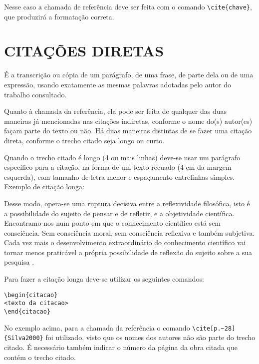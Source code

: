 Nesse caso a chamada de referência deve ser feita com o comando \verb|\cite{chave}|, que produzirá a formatação correta.

\chapter{CITAÇÕES DIRETAS}
\label{chap:citacoesLiterais}

É a transcrição ou cópia de um parágrafo, de uma frase, de parte dela ou de uma expressão, usando exatamente as mesmas palavras adotadas pelo autor do trabalho consultado.

Quanto à chamada da referência, ela pode ser feita de qualquer das duas maneiras já mencionadas nas citações indiretas, conforme o nome do(s) autor(es) façam parte do texto ou não. Há duas maneiras distintas de se fazer uma citação direta, conforme o trecho citado seja longo ou curto.

Quando o trecho citado é longo (4 ou mais linhas) deve-se usar um parágrafo específico para a citação, na forma de um texto recuado (4 cm da margem esquerda), com tamanho de letra menor e espaçamento entrelinhas simples. Exemplo de citação longa:
\\\begin{citacao}
    Desse modo, opera-se uma ruptura decisiva entre a reflexividade filosófica, isto é a possibilidade do sujeito de pensar e de refletir, e a objetividade científica. Encontramo-nos num ponto em que o conhecimento científico está sem consciência. Sem consciência moral, sem consciência reflexiva e também subjetiva. Cada vez mais o desenvolvimento extraordinário do conhecimento científico vai tornar menos praticável a própria possibilidade de reflexão do sujeito sobre a sua pesquisa \cite[p.~28]{Silva2000}.
\end{citacao}

Para fazer a citação longa deve-se utilizar os seguintes comandos:
\begin{verbatim}
\begin{citacao}
<texto da citacao>
\end{citacao}
\end{verbatim}

No exemplo acima, para a chamada da referência o comando \verb|\cite[p.~28]{Silva2000}| foi utilizado, visto que os nomes dos autores não são parte do trecho citado. É necessário também indicar o número da página da obra citada que contém o trecho citado.

